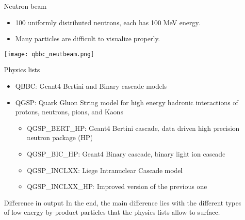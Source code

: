 \documentclass[11pt]{beamer}
\begin{document}
\begin{frame}{Neutron beam}
        \begin{itemize}
        \item<tri@1-> 100 uniformly distributed neutrons, each has 100 MeV energy.
        \vspace{0.2 cm}
        \item<tri@1-> Many particles are difficult to visualize properly.
        \vspace{0.2 cm}
    \end{itemize}
    \centering
    \texttt{[image: qbbc\_neutbeam.png]}
\end{frame}

\begin{frame}{Physics lists}
    \begin{itemize}
        \item<tri@1-> QBBC: Geant4 Bertini and Binary cascade models
        \vspace{0.2 cm}
        \item<tri@1-> QGSP: Quark Gluon String model for high energy hadronic interactions of protons, neutrons, pions, and Kaons
        \vspace{0.2 cm}
        \begin{itemize}
            \item<square@1-> QGSP\_BERT\_HP: Geant4 Bertini cascade, data driven high precision neutron package (HP)
            \vspace{0.2 cm}
            \item<square@1-> QGSP\_BIC\_HP: Geant4 Binary cascade, binary light ion cascade
            \vspace{0.2 cm}
            \item<square@1-> QGSP\_INCLXX: Liege Intranuclear Cascade model
            \vspace{0.2 cm}
            \item<square@1-> QGSP\_INCLXX\_HP: Improved version of the previous one
        \end{itemize}
    \end{itemize}
    
\begin{alertblock}{Difference in output}
In the end, the main difference lies with the different types of low energy by-product particles that the physics lists allow to surface.
\end{alertblock}
\end{frame}
\end{document}
